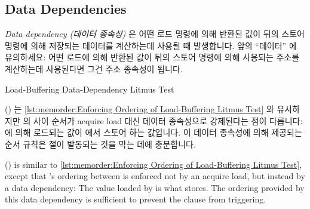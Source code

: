 \fi

\subsection{Data Dependencies}
\label{sec:memorder:Data Reordering}

\emph{Data dependency (데이터 종속성)} 은 어떤 로드 명령에 의해 반환된 값이
뒤의 스토어 명령에 의해 저장되는 데이터를 계산하는데 사용될 때 발생합니다.
앞의 ``데이터'' 에 유의하세요: 어떤 로드에 의해 반환된 값이 뒤의 스토어 명령에
의해 사용되는 주소를 계산하는데 사용된다면 그건 주소 종속성이 됩니다.

\begin{listing}[tbp]

\caption{Load-Buffering Data-Dependency Litmus Test}
\label{lst:memorder:Load-Buffering Data-Dependency Litmus Test}
\end{listing}

\begin{fcvref}
()
는
\cref{lst:memorder:Enforcing Ordering of Load-Buffering Litmus Test}
와 유사하지만  의  사이 순서가 acquire load 대신 데이터
종속성으로 강제된다는 점이 다릅니다:
 에 의해 로드되는 값이  에서 스토어 하는 값입니다.
이 데이터 종속성에 의해 제공되는 순서 규칙은  절이 발동되는 것을
막는 데에 충분합니다.
\end{fcvref}

\iffalse

\begin{fcvref}
()
is similar to
\cref{lst:memorder:Enforcing Ordering of Load-Buffering Litmus Test},
except that 's ordering between  is
enforced not by an acquire load, but instead by a data dependency:
The value loaded by  is what  stores.
The ordering provided by this data dependency is sufficient to prevent
the  clause from triggering.
\end{fcvref}

